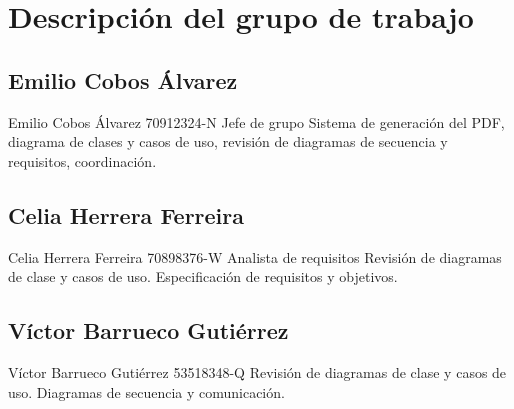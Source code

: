 \section{Descripción del grupo de trabajo}

\subsection{Emilio Cobos Álvarez}

\staff
{Emilio Cobos Álvarez}
{70912324-N}
{Jefe de grupo}
{Sistema de generación del PDF, diagrama de clases y casos de uso, revisión de diagramas de secuencia y requisitos, coordinación.}

\subsection{Celia Herrera Ferreira}
\staff
{Celia Herrera Ferreira}
{70898376-W}
{Analista de requisitos}
{Revisión de diagramas de clase y casos de uso. Especificación de requisitos y objetivos.}

\subsection{Víctor Barrueco Gutiérrez}
\staff
{Víctor Barrueco Gutiérrez}
{53518348-Q}
{}
{Revisión de diagramas de clase y casos de uso. Diagramas de secuencia y comunicación.}

